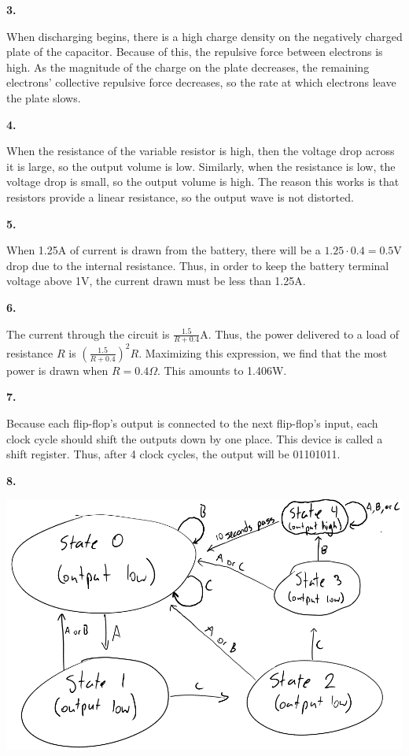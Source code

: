 \documentclass{article}
\begin{document}
\newpage\noindent\textbf{3.}

    When discharging begins, there is a high charge density on the negatively charged plate of the capacitor.
    Because of this, the repulsive force between electrons is high.
    As the magnitude of the charge on the plate decreases, the remaining electrons' collective repulsive force decreases, so the rate at which electrons leave the plate slows.

\newpage\noindent\textbf{4.}

    When the resistance of the variable resistor is high, then the voltage drop across it is large, so the output volume is low.
    Similarly, when the resistance is low, the voltage drop is small, so the output volume is high.
    The reason this works is that resistors provide a linear resistance, so the output wave is not distorted.

\newpage\noindent\textbf{5.}

    When 1.25A of current is drawn from the battery, there will be a $1.25 \cdot 0.4 = 0.5$V drop due to the internal resistance. Thus, in order to keep the battery terminal voltage above 1V, the current drawn must be less than 1.25A.

\newpage\noindent\textbf{6.}

    The current through the circuit is $\frac{1.5}{R + 0.4}$A.
    Thus, the power delivered to a load of resistance $R$ is $\left(\frac{1.5}{R+0.4}\right)^2R$.
    Maximizing this expression, we find that the most power is drawn when $R=0.4\Omega$.
    This amounts to 1.406W.

\newpage\noindent\textbf{7.}

    Because each flip-flop's output is connected to the next flip-flop's input, each clock cycle should shift the outputs down by one place.
    This device is called a shift register.
    Thus, after 4 clock cycles, the output will be 01101011.
    
\newpage\noindent\textbf{8.}
\begin{center}
    \includegraphics[scale=.6]{3.png}
\end{center}
\end{document}

